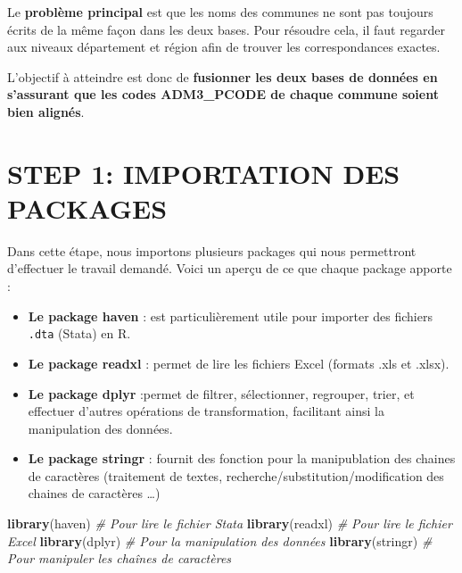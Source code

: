 \documentclass[
]{article}
\newenvironment{Shaded}{\begin{snugshade}}{\end{snugshade}}
\newcommand{\CommentTok}[1]{\textcolor[rgb]{0.56,0.35,0.01}{\textit{#1}}}
\newcommand{\FunctionTok}[1]{\textcolor[rgb]{0.13,0.29,0.53}{\textbf{#1}}}
\newcommand{\NormalTok}[1]{#1}
\providecommand{\tightlist}{%
  \setlength{\itemsep}{0pt}\setlength{\parskip}{0pt}}
\begin{document}
Le \textbf{problème principal} est que les noms des communes ne sont pas
toujours écrits de la même façon dans les deux bases. Pour résoudre
cela, il faut regarder aux niveaux département et région afin de trouver
les correspondances exactes.

L'objectif à atteindre est donc de \textbf{fusionner les deux bases de
données en s'assurant que les codes ADM3\_PCODE de chaque commune soient
bien alignés}.

\newpage
{}
\section*{\centering \Huge STEP 1: IMPORTATION DES PACKAGES}

Dans cette étape, nous importons plusieurs packages qui nous permettront
d'effectuer le travail demandé. Voici un aperçu de ce que chaque package
apporte :

\begin{itemize}
\tightlist
\item
  \textbf{Le package haven} : est particulièrement utile pour importer
  des fichiers \texttt{.dta} (Stata) en R.
\item
  \textbf{Le package readxl} : permet de lire les fichiers Excel
  (formats .xls et .xlsx).
\item
  \textbf{Le package dplyr} :permet de filtrer, sélectionner, regrouper,
  trier, et effectuer d'autres opérations de transformation, facilitant
  ainsi la manipulation des données.
\item
  \textbf{Le package stringr} : fournit des fonction pour la
  manipublation des chaines de caractères (traitement de textes,
  recherche/substitution/modification des chaines de caractères \ldots)
\end{itemize}

\begin{Shaded}
\begin{Highlighting}[]
\FunctionTok{library}\NormalTok{(haven)    }\CommentTok{\# Pour lire le fichier Stata}
\FunctionTok{library}\NormalTok{(readxl)   }\CommentTok{\# Pour lire le fichier Excel}
\FunctionTok{library}\NormalTok{(dplyr)    }\CommentTok{\# Pour la manipulation des données}
\FunctionTok{library}\NormalTok{(stringr)  }\CommentTok{\# Pour manipuler les chaînes de caractères}
\end{Highlighting}
\end{Shaded}
\end{document}
